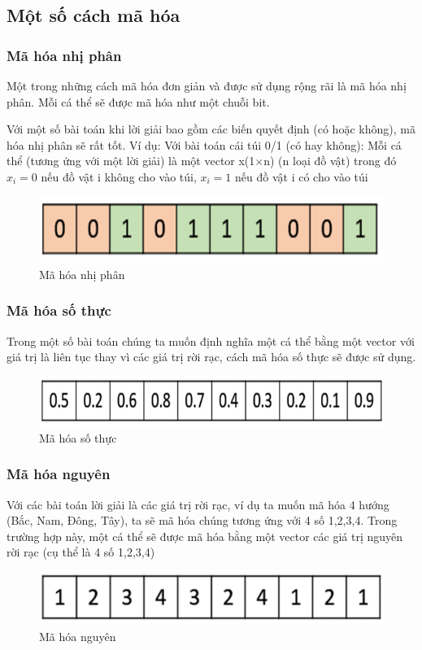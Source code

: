 \documentclass[a4paper,12pt]{report}
\begin{document}
\subsection{Một số cách mã hóa}\label{sub_encode}
\subsubsection{Mã hóa nhị phân}
Một trong những cách mã hóa đơn giản và được sử dụng rộng rãi là mã hóa nhị phân. Mỗi cá thể sẽ được mã hóa như một chuỗi bit.
\par Với một số bài toán khi lời giải bao gồm các biến quyết định (có hoặc không), mã hóa nhị phân sẽ rất tốt. Ví dụ: Với bài toán cái túi 0/1 (có hay không): Mỗi cá thể (tương ứng với một lời giải) là một vector x(1$\times$n) (n loại đồ vật) trong đó $x_i=0$ nếu đồ vật i không cho vào túi, $x_i=1$ nếu đồ vật i có cho vào túi
\begin{figure}[H]
\centering 
\includegraphics[scale=0.6]{binary_representation.PNG}
\caption{Mã hóa nhị phân}
\end{figure}  

\subsubsection{Mã hóa số thực}
Trong một số bài toán chúng ta muốn định nghĩa một cá thể bằng một vector với giá trị là liên tục thay vì các giá trị rời rạc, cách mã hóa số thực sẽ được sử dụng.
\begin{figure}[H]
\centering 
\includegraphics[scale=0.6]{real_representation.PNG}
\caption{Mã hóa số thực}
\end{figure}

\subsubsection{Mã hóa nguyên}
Với các bài toán lời giải là các giá trị rời rạc, ví dụ ta muốn mã hóa 4 hướng (Bắc, Nam, Đông, Tây), ta sẽ mã hóa chúng tương ứng với 4 số {1,2,3,4}. Trong trường hợp này, một cá thể sẽ được mã hóa bằng một vector các giá trị nguyên rời rạc (cụ thể là 4 số {1,2,3,4})
\begin{figure}[H]
\centering 
\includegraphics[scale=0.6]{integer_representation.PNG}
\caption{Mã hóa nguyên}
\end{figure}
\end{document}
